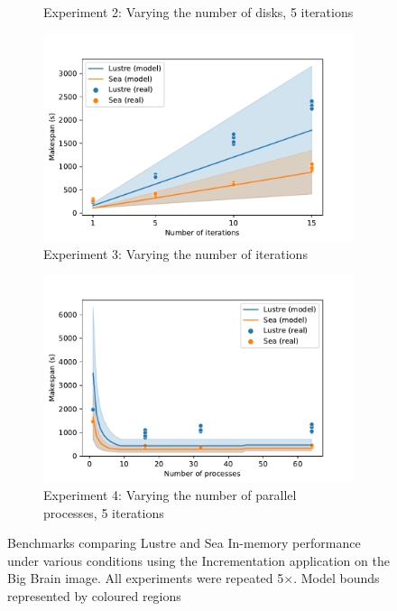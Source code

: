 \begin{figure}
\begin{subfigure}{0.5\columnwidth}
        \caption{Experiment 2: Varying the number of disks, 5
        iterations}\label{fig:sea-comp:disks}
    \end{subfigure}
    \begin{subfigure}{0.5\columnwidth}
        \centering
        \captionsetup{width=.85\linewidth}
        \includegraphics[width=\linewidth]{figures/sea-comp/iterations.pdf}
        \caption{Experiment 3: Varying the number of
        iterations}\label{fig:sea-comp:iterations}
    \end{subfigure}
    \begin{subfigure}{0.5\columnwidth}
        \centering
        \captionsetup{width=.85\linewidth}
        \includegraphics[width=\linewidth]{figures/sea-comp/threads.pdf}
        \caption{Experiment 4: Varying the number of parallel processes, 5
        iterations}\label{fig:sea-comp:processes}
    \end{subfigure}
    \caption{Benchmarks comparing Lustre and Sea In-memory performance under
    various conditions using the Incrementation application on the Big Brain
    image. All experiments were repeated 5$\times$. Model bounds represented by coloured regions}
    \label{fig:sea-comp:benchmarks}
    \end{figure}

